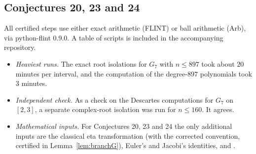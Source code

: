\documentclass[11pt]{amsart}
\theoremstyle{remark}
\theoremstyle{definition}
\begin{document}
\subsection*{Conjectures 20, 23 and 24}
All certified steps use either exact arithmetic (FLINT) or ball arithmetic (Arb), via python-flint 0.9.0. A table of scripts is included in the accompanying repository.
\begin{itemize}[leftmargin=2em]
\item \emph{Heaviest runs.} The exact root isolations for $G_7$ with $n\le897$ took about $20$ minutes per interval, and the computation of the degree-$897$ polynomials took $3$ minutes.
\item \emph{Independent check.} As a check on the Descartes computations for $G_7$ on $[2,3]$, a separate complex-root isolation was run for $n\le160$. It agrees.
\item \emph{Mathematical inputs.} For Conjectures 20, 23 and 24 the only additional inputs are the classical eta transformation (with the corrected convention, certified in Lemma~\ref{lem:branchG}), Euler's and Jacobi's identities, and \cite{AB}.
\end{itemize}
\end{document}
